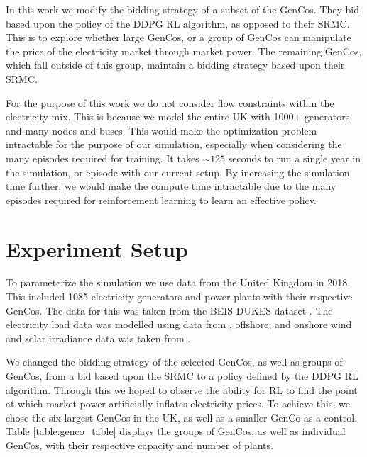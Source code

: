 \documentclass[conference]{IEEEtran}
\begin{document}
In this work we modify the bidding strategy of a subset of the GenCos. They bid based upon the policy of the DDPG RL algorithm, as opposed to their SRMC. This is to explore whether large GenCos, or a group of GenCos can manipulate the price of the electricity market through market power. The remaining GenCos, which fall outside of this group, maintain a bidding strategy based upon their SRMC.

For the purpose of this work we do not consider flow constraints within the electricity mix. This is because we model the entire UK with 1000+ generators, and many nodes and buses. This would make the optimization problem intractable for the purpose of our simulation, especially when considering the many episodes required for training. It takes ${\sim}125$ seconds to run a single year in the simulation, or episode with our current setup. By increasing the simulation time further, we would make the compute time intractable due to the many episodes required for reinforcement learning to learn an effective policy.










\section{Experiment Setup}
\label{sec:methodology}


To parameterize the simulation we use data from the United Kingdom in 2018. This included 1085 electricity generators and power plants with their respective GenCos. The data for this was taken from the BEIS DUKES dataset \cite{dukes_511}. The electricity load data was modelled using data from \cite{gridwatch}, offshore, and onshore wind and solar irradiance data was taken from \cite{Pfenninger2016}.

We changed the bidding strategy of the selected GenCos, as well as groups of GenCos, from a bid based upon the SRMC to a policy defined by the DDPG RL algorithm. Through this we hoped to observe the ability for RL to find the point at which market power  artificially inflates electricity prices. To achieve this, we chose the six largest GenCos in the UK, as well as a smaller GenCo as a control. Table \ref{table:genco_table} displays the groups of GenCos, as well as individual GenCos, with their respective capacity and number of plants.
\end{document}
